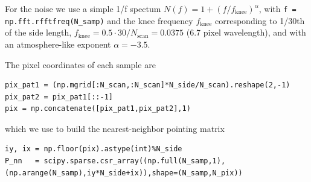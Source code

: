 \documentclass{aa}
\begin{document}
For the noise we use a simple 1/f spectum $N(f) = 1 + (f/f_\text{knee})^\alpha$,
with \lstinline{f = np.fft.rfftfreq(N_samp)}
and the knee frequency $f_\text{knee}$ corresponding to 1/30th of the side length,
$f_\text{knee} = 0.5\cdot 30/N_\text{scan} = 0.0375$ (6.7 pixel wavelength), and with
an atmosphere-like exponent $\alpha=-3.5$.

The pixel coordinates of each sample are
\begin{lstlisting}
pix_pat1 = (np.mgrid[:N_scan,:N_scan]*N_side/N_scan).reshape(2,-1)
pix_pat2 = pix_pat1[::-1]
pix = np.concatenate([pix_pat1,pix_pat2],1)
\end{lstlisting}
which we use to build the nearest-neighbor pointing matrix
\begin{lstlisting}
iy, ix = np.floor(pix).astype(int)%N_side
P_nn   = scipy.sparse.csr_array((np.full(N_samp,1),(np.arange(N_samp),iy*N_side+ix)),shape=(N_samp,N_pix))
\end{lstlisting}
\end{document}
